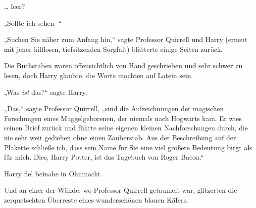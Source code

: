 … leer?

„Sollte ich sehen -“

„Suchen Sie näher zum Anfang hin,“ sagte Professor Quirrell und Harry (erneut mit jener hilflosen, tiefsitzenden Sorgfalt) blätterte einige Seiten zurück.

Die Buchstaben waren offensichtlich von Hand geschrieben und sehr schwer zu lesen, doch Harry glaubte, die Worte mochten auf Latein sein.

„Was \emph{ist} das?“ sagte Harry.

„Das,“ sagte Professor Quirrell, „sind die Aufzeichnungen der magischen Forschungen eines Muggelgeborenen, der niemals nach Hogwarts kam. Er wies seinen Brief zurück und führte seine eigenen kleinen Nachforschungen durch, die nie sehr weit gediehen ohne einen Zauberstab. Aus der Beschreibung auf der Plakette schließe ich, dass sein Name für Sie eine viel größere Bedeutung birgt als für mich. Dies, Harry Potter, ist das Tagebuch von Roger Bacon.“

Harry fiel beinahe in Ohnmacht.

Und an einer der Wände, wo Professor Quirrell getaumelt war, glitzerten die zerquetschten Überreste eines wunderschönen blauen Käfers.

